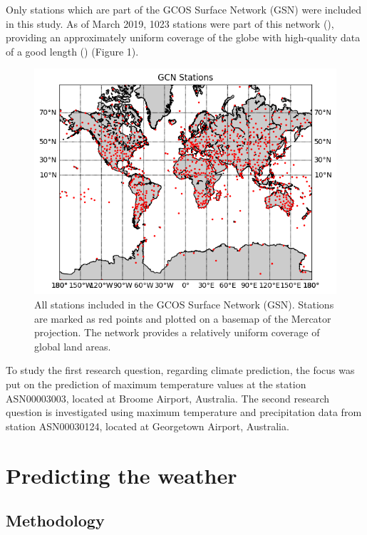 \documentclass[12pt]{article}
\begin{document}
    Only stations which are part of the GCOS Surface Network (GSN) were included in this study. As of March 2019, 1023 stations were part of this network (\cite{oakley_2019_gcos}), providing an approximately uniform coverage of the globe with high-quality data of a good length (\cite{theglobalclimateobservingsystem_gcos}) (Figure 1).

    \begin{figure}
        \centering
        \includegraphics[scale = 1.2]{all_stations.png}
        \caption{All stations included in the GCOS Surface Network (GSN). Stations are marked as red points and plotted on a basemap of the Mercator projection. The network provides a relatively uniform coverage of global land areas.}
        \label{fig:all_stations}
    \end{figure}

    To study the first research question, regarding climate prediction, the focus was put on the prediction of maximum temperature values at the station ASN00003003, located at Broome Airport, Australia. The second research question is investigated using maximum temperature and precipitation data from station ASN00030124, located at Georgetown Airport, Australia.

\section{Predicting the weather}

    \subsection{Methodology}
\end{document}
